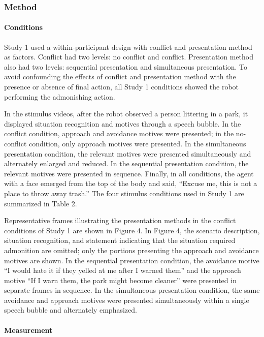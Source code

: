 \subsubsection{Method}\label{method}

\paragraph{Conditions}\label{conditions}

Study 1 used a within-participant design with conflict and presentation
method as factors. Conflict had two levels: no conflict and conflict.
Presentation method also had two levels: sequential presentation and
simultaneous presentation. To avoid confounding the effects of conflict
and presentation method with the presence or absence of final action,
all Study 1 conditions showed the robot performing the admonishing
action.

In the stimulus videos, after the robot observed a person littering in a
park, it displayed situation recognition and motives through a speech
bubble. In the conflict condition, approach and avoidance motives were
presented; in the no-conflict condition, only approach motives were
presented. In the simultaneous presentation condition, the relevant
motives were presented simultaneously and alternately enlarged and
reduced. In the sequential presentation condition, the relevant motives
were presented in sequence. Finally, in all conditions, the agent with a
face emerged from the top of the body and said, ``Excuse me, this is not
a place to throw away trash.'' The four stimulus conditions used in
Study 1 are summarized in Table 2.

Representative frames illustrating the presentation methods in the
conflict conditions of Study 1 are shown in Figure 4. In Figure 4, the
scenario description, situation recognition, and statement indicating
that the situation required admonition are omitted; only the portions
presenting the approach and avoidance motives are shown. In the
sequential presentation condition, the avoidance motive ``I would hate
it if they yelled at me after I warned them'' and the approach motive
``If I warn them, the park might become cleaner'' were presented in
separate frames in sequence. In the simultaneous presentation condition,
the same avoidance and approach motives were presented simultaneously
within a single speech bubble and alternately emphasized.

\paragraph{Measurement}\label{measurement}

